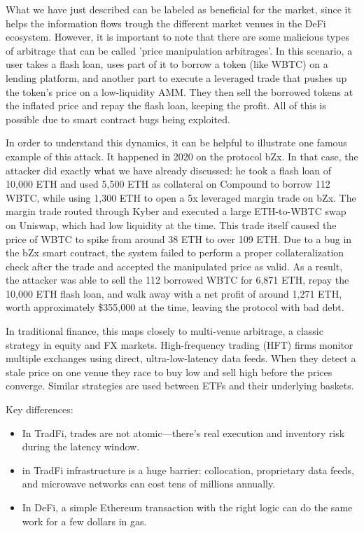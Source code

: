 \documentclass[a4paper,11pt]{article}
\begin{document}
What we have just described can be labeled as beneficial for the market, since it helps the information flows trough the different market venues in the DeFi ecosystem. However, it is important to note that there are some malicious types of arbitrage that can be called 'price manipulation arbitrages'. In this scenario, a user takes a flash loan, uses part of it to borrow a token (like WBTC) on a lending platform, and another part to execute a leveraged trade that pushes up the token’s price on a low-liquidity AMM. They then sell the borrowed tokens at the inflated price and repay the flash loan, keeping the profit. All of this is possible due to smart contract bugs being exploited.

In order to understand this dynamics, it can be helpful to illustrate one famous example of this attack. It happened in 2020 on the protocol bZx. In that case, the attacker did exactly what we have already discussed: he took a flash loan of 10,000 ETH and used 5,500 ETH as collateral on Compound to borrow 112 WBTC, while using 1,300 ETH to open a 5x leveraged margin trade on bZx. The margin trade routed through Kyber and executed a large ETH-to-WBTC swap on Uniswap, which had low liquidity at the time. This trade itself caused the price of WBTC to spike from around 38 ETH to over 109 ETH. Due to a bug in the bZx smart contract, the system failed to perform a proper collateralization check after the trade and accepted the manipulated price as valid. As a result, the attacker was able to sell the 112 borrowed WBTC for 6,871 ETH, repay the 10,000 ETH flash loan, and walk away with a net profit of around 1,271 ETH, worth approximately \$355,000 at the time, leaving the protocol with bad debt.

In traditional finance, this maps closely to multi-venue arbitrage, a classic strategy in equity and FX markets. High-frequency trading (HFT) firms monitor multiple exchanges using direct, ultra-low-latency data feeds. When they detect a stale price on one venue they race to buy low and sell high before the prices converge. Similar strategies are used between ETFs and their underlying baskets.

Key differences:
\begin{itemize}
    \item In TradFi, trades are not atomic—there’s real execution and inventory risk during the latency window.
    \item in TradFi infrastructure is a huge barrier: collocation, proprietary data feeds, and microwave networks can cost tens of millions annually.
    \item In DeFi, a simple Ethereum transaction with the right logic can do the same work for a few dollars in gas.
\end{itemize}
\end{document}
